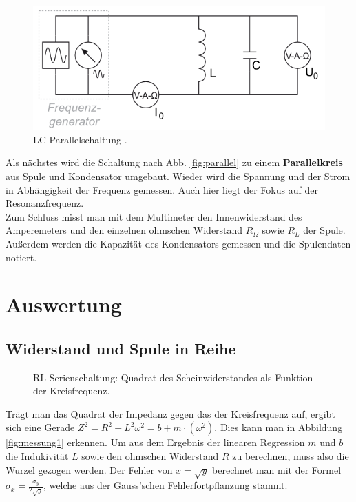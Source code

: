 \documentclass[12pt,a4paper,titlepage,headinclude,bibtotoc]{scrartcl}
\begin{document}
\begin{figure}[!htb]
	\centering
	\includegraphics[scale=1.0]{parallel.png}
	\caption{LC-Parallelschaltung \cite[Datum: 03.10.14]{LP14}.}
	\label{fig:parallel}
\end{figure}


Als nächstes wird die Schaltung nach Abb. \eqref{fig:parallel} zu einem \textbf{Parallelkreis} aus Spule und Kondensator umgebaut.
Wieder wird die Spannung und der Strom in Abhängigkeit der Frequenz gemessen.
Auch hier liegt der Fokus auf der Resonanzfrequenz.\\

Zum Schluss misst man mit dem Multimeter den Innenwiderstand des Amperemeters und den einzelnen ohmschen Widerstand $R_\Omega$ sowie $R_L$ der Spule.
Außerdem werden die Kapazität des Kondensators gemessen und die Spulendaten notiert. 

\section{Auswertung}
\label{sec:auswertung}
\subsection{Widerstand und Spule in Reihe}
\begin{figure}[!htb]
	\centering
	
	\caption{RL-Serienschaltung: Quadrat des Scheinwiderstandes als Funktion der Kreisfrequenz.}
	\label{fig:messung1}
\end{figure}
Trägt man das Quadrat der Impedanz gegen das der Kreisfrequenz auf, ergibt sich eine Gerade $Z^2=R^2+L^2\omega^2=b+m\cdot(\omega^2)$.
Dies kann man in Abbildung \eqref{fig:messung1} erkennen.
Um aus dem Ergebnis der linearen Regression $m$ und $b$ die Indukivität  $L$ sowie den ohmschen Widerstand $R$ zu berechnen, muss also die Wurzel gezogen werden.
Der Fehler von $x=\sqrt{y}$ berechnet man mit der Formel $\sigma_x=\frac{\sigma_y}{2\sqrt{y}}$, welche aus der Gauss'schen  Fehlerfortpflanzung stammt.
\end{document}
